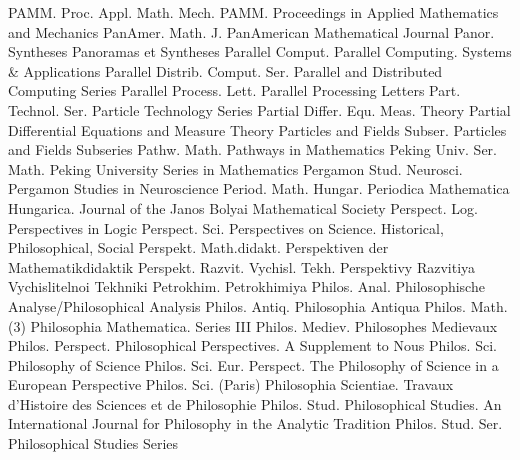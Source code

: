 {PAMM. Proc. Appl. Math. Mech.}
{PAMM. Proceedings in Applied Mathematics and Mechanics}
{PanAmer. Math. J.}
{PanAmerican Mathematical Journal}
{Panor. Syntheses}
{Panoramas et Syntheses}
{Parallel Comput.}
{Parallel Computing. Systems & Applications}
{Parallel Distrib. Comput. Ser.}
{Parallel and Distributed Computing Series}
{Parallel Process. Lett.}
{Parallel Processing Letters}
{Part. Technol. Ser.}
{Particle Technology Series}
{Partial Differ. Equ. Meas. Theory}
{Partial Differential Equations and Measure Theory}
{Particles and Fields Subser.}
{Particles and Fields Subseries}
{Pathw. Math.}
{Pathways in Mathematics}
{Peking Univ. Ser. Math.}
{Peking University Series in Mathematics}
{Pergamon Stud. Neurosci.}
{Pergamon Studies in Neuroscience}
{Period. Math. Hungar.}
{Periodica Mathematica Hungarica. Journal of the Janos Bolyai Mathematical Society}
{Perspect. Log.}
{Perspectives in Logic}
{Perspect. Sci.}
{Perspectives on Science. Historical, Philosophical, Social}
{Perspekt. Math.didakt.}
{Perspektiven der Mathematikdidaktik}
{Perspekt. Razvit. Vychisl. Tekh.}
{Perspektivy Razvitiya Vychislitelnoi Tekhniki}
{Petrokhim.}
{Petrokhimiya}
{Philos. Anal.}
{Philosophische Analyse/Philosophical Analysis}
{Philos. Antiq.}
{Philosophia Antiqua}
{Philos. Math. (3)}
{Philosophia Mathematica. Series III}
{Philos. Mediev.}
{Philosophes Medievaux}
{Philos. Perspect.}
{Philosophical Perspectives. A Supplement to Nous}
{Philos. Sci.}
{Philosophy of Science}
{Philos. Sci. Eur. Perspect.}
{The Philosophy of Science in a European Perspective}
{Philos. Sci. (Paris)}
{Philosophia Scientiae. Travaux d'Histoire des Sciences et de Philosophie}
{Philos. Stud.}
{Philosophical Studies. An International Journal for Philosophy in the Analytic Tradition}
{Philos. Stud. Ser.}
{Philosophical Studies Series}
